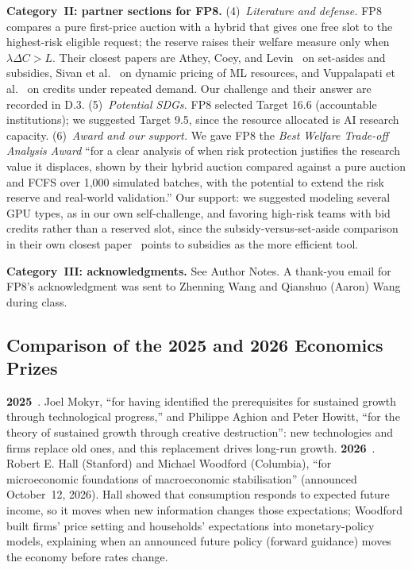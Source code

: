 \textbf{Category~II: partner sections for FP8.}
(4)~\emph{Literature and defense.} FP8 compares a pure first-price auction with a hybrid that gives one free slot to the highest-risk eligible request; the reserve raises their welfare measure only when $\lambda\Delta C>L$. Their closest papers are Athey, Coey, and Levin~\cite{athey2013setasides} on set-asides and subsidies, Sivan et al.~\cite{sivan2026quota} on dynamic pricing of ML resources, and Vuppalapati et al.~\cite{karma2023} on credits under repeated demand. Our challenge and their answer are recorded in D.3.
(5)~\emph{Potential SDGs.} FP8 selected Target 16.6 (accountable institutions); we suggested Target 9.5, since the resource allocated is AI research capacity.
(6)~\emph{Award and our support.} We gave FP8 the \emph{Best Welfare Trade-off Analysis Award} ``for a clear analysis of when risk protection justifies the research value it displaces, shown by their hybrid auction compared against a pure auction and FCFS over 1,000 simulated batches, with the potential to extend the risk reserve and real-world validation.'' Our support: we suggested modeling several GPU types, as in our own self-challenge, and favoring high-risk teams with bid credits rather than a reserved slot, since the subsidy-versus-set-aside comparison in their own closest paper~\cite{athey2013setasides} points to subsidies as the more efficient tool.

\textbf{Category~III: acknowledgments.} See Author Notes. A thank-you email for FP8's acknowledgment was sent to Zhenning Wang and Qianshuo (Aaron) Wang during class.

\subsection{Comparison of the 2025 and 2026 Economics Prizes}
\textbf{2025}~\cite{nobel2025}. Joel Mokyr, ``for having identified the prerequisites for sustained growth through technological progress,'' and Philippe Aghion and Peter Howitt, ``for the theory of sustained growth through creative destruction'': new technologies and firms replace old ones, and this replacement drives long-run growth.
\textbf{2026}~\cite{nobel2026}. Robert E. Hall (Stanford) and Michael Woodford (Columbia), ``for microeconomic foundations of macroeconomic stabilisation'' (announced October~12, 2026). Hall showed that consumption responds to expected future income, so it moves when new information changes those expectations; Woodford built firms' price setting and households' expectations into monetary-policy models, explaining when an announced future policy (forward guidance) moves the economy before rates change.

